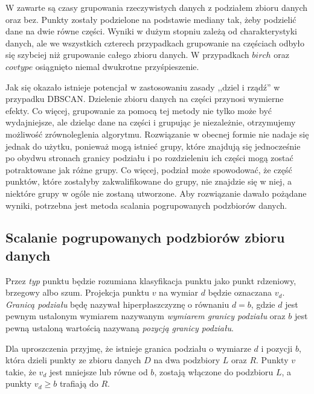 
W  zawarte są czasy grupowania rzeczywistych danych z podziałem zbioru danych oraz bez. Punkty zostały podzielone na podstawie mediany tak, żeby podzielić dane na dwie równe części. Wyniki w dużym stopniu zależą od charakterystyki danych, ale we wszystkich czterech przypadkach grupowanie na częściach odbyło się szybciej niż grupowanie całego zbioru danych. W przypadkach $ birch $ oraz $ covtype $ osiągnięto niemal dwukrotne przyśpieszenie.\par
Jak się okazało istnieje potencjał w zastosowaniu zasady ,,dziel i rządź'' w przypadku DBSCAN. Dzielenie zbioru danych na części przynosi wymierne efekty. Co więcej, grupowanie za pomocą tej metody nie tylko może być wydajniejsze, ale dzieląc dane na części i grupując je niezależnie, otrzymujemy możliwość zrównoleglenia algorytmu. Rozwiązanie w obecnej formie nie nadaje się jednak do użytku, ponieważ mogą istnieć grupy, które znajdują się jednocześnie po obydwu stronach granicy podziału i po rozdzieleniu ich części mogą zostać potraktowane jak różne grupy. Co więcej, podział może spowodować, że  część punktów, które zostałyby zakwalifikowane do grupy, nie znajdzie się w niej, a niektóre grupy w ogóle nie zostaną utworzone. Aby rozwiązanie dawało pożądane wyniki, potrzebna jest metoda scalania pogrupowanych podzbiorów danych.

\subsection{Scalanie pogrupowanych podzbiorów zbioru danych}
Przez \textit{typ} punktu będzie rozumiana klasyfikacja punktu jako punkt rdzeniowy, brzegowy albo szum. Projekcja punktu $ v $ na wymiar $ d $ będzie oznaczana $ v_d $. \textit{Granicą podziału} będę nazywał hiperpłaszczyznę o równaniu $ d=b $, gdzie $ d $ jest pewnym ustalonym wymiarem nazywanym \textit{wymiarem granicy podziału} oraz $ b $ jest pewną ustaloną wartością nazywaną \textit{pozycją granicy podziału}.

Dla uproszczenia przyjmę, że istnieje granica podziału o wymiarze $ d $ i pozycji $ b $, która dzieli punkty ze zbioru danych $ D $ na dwa podzbiory $ L $ oraz $ R $. Punkty $ v $ takie, że $ v_d $ jest mniejsze lub równe od $ b $, zostają włączone do podzbioru $ L $, a punkty $ v_d \ge b $ trafiają do $ R $.



